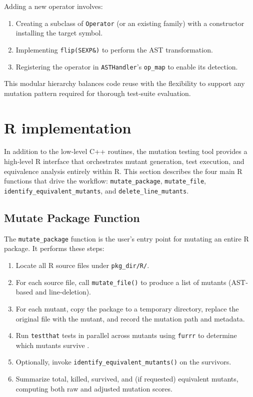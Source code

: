 Adding a new operator involves:

\begin{enumerate}
  \item Creating a subclass of \texttt{Operator} (or an existing family) with a constructor installing the target symbol.
  \item Implementing \texttt{flip(SEXP\&)} to perform the AST transformation.
  \item Registering the operator in \texttt{ASTHandler}’s \texttt{op_map} to enable its detection.
\end{enumerate}

This modular hierarchy balances code reuse with the flexibility to support any mutation pattern required for thorough test‐suite evaluation.

\section{R implementation}

In addition to the low‐level C++ routines, the mutation testing tool provides a high‐level R interface that orchestrates mutant generation, test execution, and equivalence analysis entirely within R.  This section describes the four main R functions that drive the workflow: \texttt{mutate\_package}, \texttt{mutate\_file}, \texttt{identify\_equivalent\_mutants}, and \texttt{delete\_line\_mutants}.

\subsection{Mutate Package Function}

The \texttt{mutate\_package} function is the user’s entry point for mutating an entire R package.  It performs these steps:

\begin{enumerate}
  \item Locate all R source files under \texttt{pkg\_dir/R/}.  
  \item For each source file, call \texttt{mutate\_file()} to produce a list of mutants (AST‐based and line‐deletion).  
  \item For each mutant, copy the package to a temporary directory, replace the original file with the mutant, and record the mutation path and metadata.  
  \item Run \texttt{testthat} tests in parallel across mutants using \texttt{furrr} to determine which mutants survive \cite{wickham2011testthat,Vaughan2020furrr}.  
  \item Optionally, invoke \texttt{identify\_equivalent\_mutants()} on the survivors.  
  \item Summarize total, killed, survived, and (if requested) equivalent mutants, computing both raw and adjusted mutation scores.
\end{enumerate}

